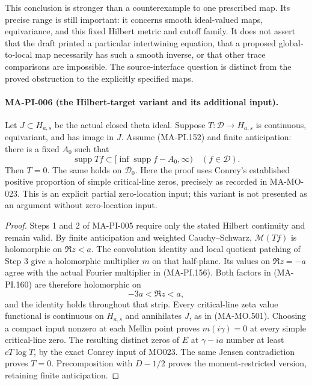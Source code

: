 This conclusion is stronger than a counterexample to
one prescribed map.  Its precise range is still
important: it concerns smooth ideal-valued maps,
equivariance, and this fixed Hilbert metric and cutoff
family.  It does not assert that the draft printed a
particular intertwining equation, that a proposed
global-to-local map necessarily has such a smooth
inverse, or that other trace comparisons are impossible.
The source-interface question is distinct from the
proved obstruction to the explicitly specified maps.

\paragraph{MA-PI-006 (the Hilbert-target variant and its additional input).}
Let $J\subset H_{a,s}$ be the actual closed theta ideal.
Suppose $T:\mathcal D\to H_{a,s}$ is continuous,
equivariant, and has image in $J$.  Assume (MA-PI.152)
and finite anticipation: there is a fixed $A_0$ such
that
\[
 \operatorname{supp}Tf\subset
       [\inf\operatorname{supp}f-A_0,\infty)
                         \quad(f\in\mathcal D).
 \tag{MA-PI.164}
\]
Then $T=0$.  The same holds on $\mathcal D_0$.
Here the proof uses Conrey's established positive
proportion of simple critical-line zeros, precisely
as recorded in MA-MO-023.  This is an explicit partial
zero-location input; this variant is not presented
as an argument without zero-location input.

\begin{proof}
Steps 1 and 2 of MA-PI-005 require only the stated
Hilbert continuity and remain valid.  By finite
anticipation and weighted Cauchy--Schwarz,
$\mathcal M(Tf)$ is holomorphic on $\Re z<a$.
The convolution identity and local quotient patching
of Step 3 give a holomorphic multiplier $m$ on that
half-plane.  Its values on $\Re z=-a$ agree with the
actual Fourier multiplier in (MA-PI.156).
Both factors in (MA-PI.160) are therefore holomorphic
on
\[
                         -3a<\Re z<a,
 \tag{MA-PI.165}
\]
and the identity holds throughout that strip.
Every critical-line zeta value functional is
continuous on $H_{a,s}$ and annihilates $J$, as in
(MA-MO.501).  Choosing a compact input nonzero at
each Mellin point proves $m(i\gamma)=0$ at every
simple critical-line zero.  The resulting distinct
zeros of $E$ at $\gamma-ia$ number at least
$cT\log T$, by the exact Conrey input of MO023.
The same Jensen contradiction proves $T=0$.
Precomposition with $D-1/2$ proves the moment-restricted
version, retaining finite anticipation.
\end{proof}

